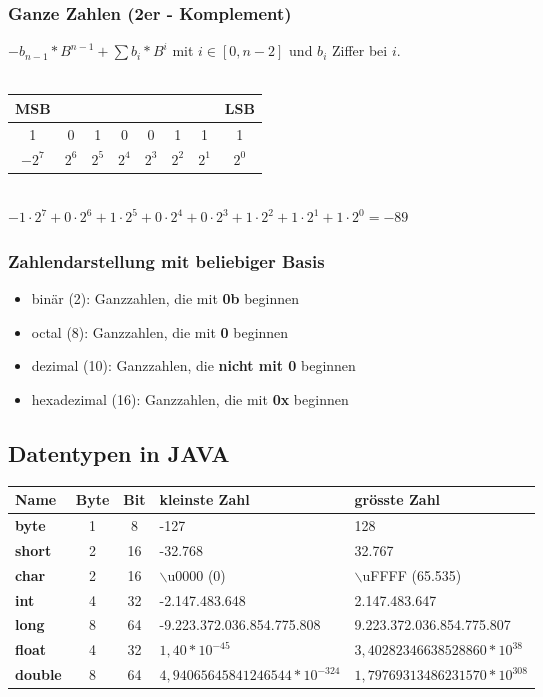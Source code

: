 \documentclass[a4paper,10pt]{article}
\newcommand{\Bold}[1]{\textbf{#1}} %
\begin{document}
\subsubsection{Ganze Zahlen (2er - Komplement)}
$-b_{n-1}*B^{n-1}+\sum b_i*B^i$ mit $i \in [0,n-2]$ und  $b_i$ Ziffer bei $i$.\\\\
\begin{tabular}{|c|c|c|c|c|c|c|c|}
\multicolumn{1}{c}{MSB}&\multicolumn{6}{c}{}&\multicolumn{1}{c}{LSB}\\ \hline
1&0&1&0&0&1&1&1\\\hline
\multicolumn{1}{c}{$-2^7$}&\multicolumn{1}{c}{$2^6$}&\multicolumn{1}{c}{$2^5$}&\multicolumn{1}{c}{$2^4$}&\multicolumn{1}{c}{$2^3$}&\multicolumn{1}{c}{$2^2$}&\multicolumn{1}{c}{$2^1$}&\multicolumn{1}{c}{$2^0$}\\
\end{tabular}\\
$-1\cdot 2^7+0\cdot 2^6+1\cdot 2^5+0\cdot 2^4+0\cdot 2^3+1\cdot 2^2+1\cdot 2^1+1\cdot 2^0=-89$\\
\subsubsection{Zahlendarstellung mit beliebiger Basis}
\begin{itemize}
\item bin\"ar (2): Ganzzahlen, die mit \Bold{0b} beginnen
\item octal (8): Ganzzahlen, die mit \Bold{0} beginnen
\item dezimal (10): Ganzzahlen, die \Bold{nicht mit 0} beginnen
\item  hexadezimal (16): Ganzzahlen, die mit \Bold{0x} beginnen
\end{itemize}

\subsection{Datentypen in JAVA}
\begin{tabular}{l c c l l}
	Name & Byte & Bit & kleinste Zahl & gr\"osste Zahl \\
	\hline
	\Bold {byte} & 1 & 8 & -127 & 128 \\
	\Bold {short} & 2 & 16 &-32.768 & 32.767 \\
	\Bold {char} & 2 & 16 & $\backslash$u0000 (0) & 	$\backslash$uFFFF (65.535) \\
	\Bold {int} & 4 & 32 & -2.147.483.648 & 2.147.483.647 \\
	\Bold {long} & 8 & 64 & -9.223.372.036.854.775.808 & 9.223.372.036.854.775.807 \\
	\Bold {float} & 4 & 32 & $1,40 * 10^{-45}$ & $3,40282346638528860 * 10^{38}$ \\
	\Bold {double} & 8 & 64 & $4,94065645841246544*10^{-324}$ & $1,79769313486231570*10^{308}$  \\
\end{tabular}
\end{document}
